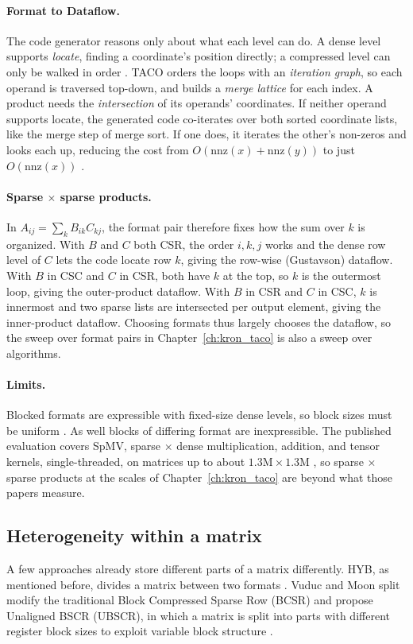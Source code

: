 \paragraph{Format to Dataflow.}
The code generator reasons only about what each level can do. A dense level supports \emph{locate}, finding a coordinate's position directly; a compressed level can only be walked in order \cite{taco_formats}.
TACO orders the loops with an \emph{iteration graph}, so each operand is traversed top-down, and builds a \emph{merge lattice} for each index. A product needs the \emph{intersection} of its operands' coordinates. If neither operand supports locate, the
generated code co-iterates over both sorted coordinate lists, like the merge step of merge sort. If one does, it iterates the other's non-zeros and looks each up, reducing the cost from $O(\mathrm{nnz}(x)+\mathrm{nnz}(y))$ to just $O(\mathrm{nnz}(x))$ \cite{taco,taco_formats}.

\paragraph{Sparse $\times$ sparse products.}
In $A_{ij} = \sum_k B_{ik}C_{kj}$, the format pair therefore fixes how the sum over $k$ is organized.
With $B$ and $C$ both CSR, the order $i,k,j$ works and the dense row level of $C$ lets the code locate row $k$, giving the row-wise (Gustavson) dataflow. With $B$ in CSC and $C$ in CSR, both have $k$ at the top, so $k$ is the outermost loop, giving the outer-product dataflow.
With $B$ in CSR and $C$ in CSC, $k$ is innermost and two sparse lists are intersected per output element, giving the inner-product dataflow. Choosing formats thus largely chooses the dataflow, so the sweep over format pairs in Chapter~\ref{ch:kron_taco} is also a sweep over algorithms.

\paragraph{Limits.}
Blocked formats are expressible with fixed-size dense levels, so block sizes must be uniform \cite{taco_formats}. As well blocks of differing format are inexpressible.
The published evaluation covers SpMV, sparse $\times$ dense multiplication, addition, and tensor kernels, single-threaded, on matrices up to about $1.3\mathrm{M}\times 1.3\mathrm{M}$ \cite{taco_formats}, so sparse $\times$ sparse products at the scales of Chapter~\ref{ch:kron_taco} are beyond what those papers measure.

\subsection{Heterogeneity within a matrix}
A few approaches already store different parts of a matrix differently. HYB, as mentioned before, divides a matrix between
two formats \cite{bell2009implementing}. Vuduc and Moon split modify the traditional Block Compressed Sparse Row (BCSR) and propose Unaligned BSCR (UBSCR), in which a matrix is split into parts with different register block sizes to exploit variable block structure \cite{vuduc2005vbr}.


